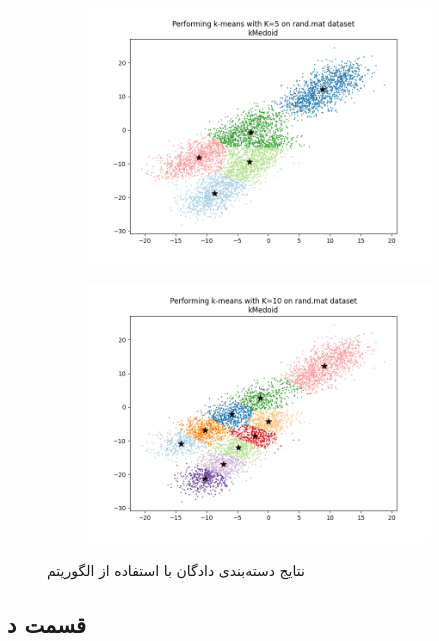 \documentclass[12pt, a4paper]{article}
\begin{document}
\begin{figure}[h]
\begin{subfigure}{.45\linewidth}
        \includegraphics[width=\linewidth]{images/q3/c/5.png}
    \end{subfigure}
    \hfill
    \begin{subfigure}{.45\linewidth}
        \includegraphics[width=\linewidth]{images/q3/c/10.png}
    \end{subfigure}
    \caption{نتایج دسته‌بندی دادگان  با استفاده از الگوریتم }
    \label{kmedoid_rand_mat}
\end{figure}

\clearpage

\subsection*{قسمت د}
\end{document}
